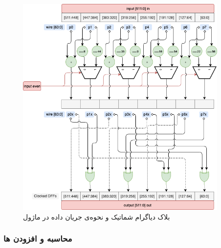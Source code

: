 \begin{figure}[H]
	\centering
	\includegraphics[width=10.5cm]{images/diagrams_round4.png}	
	\caption{
		بلاک دیاگرام شماتیک و نحوه‌ی جریان داده در ماژول 
	}
\end{figure}

\subsubsection{
	محاسبه و افزودن 
	ها
}